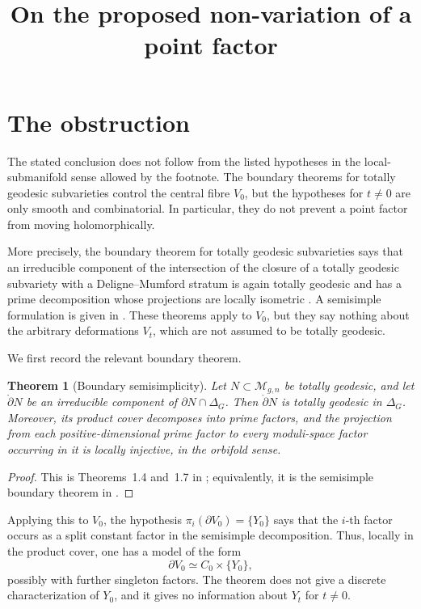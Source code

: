 \documentclass[11pt]{article}
\title{On the proposed non-variation of a point factor}
\author{}
\date{}
\newcommand{\M}{\mathcal M}
\newtheorem{theorem}{Theorem}[section]
\begin{document}
\maketitle

\section{The obstruction}

The stated conclusion does not follow from the listed hypotheses in the
local-submanifold sense allowed by the footnote.  The boundary theorems for
totally geodesic subvarieties control the central fibre \(V_0\), but the
hypotheses for \(t\neq 0\) are only smooth and combinatorial.  In particular,
they do not prevent a point factor from moving holomorphically.

More precisely, the boundary theorem for totally geodesic subvarieties says
that an irreducible component of the intersection of the closure of a totally
geodesic subvariety with a Deligne--Mumford stratum is again totally geodesic
and has a prime decomposition whose projections are locally isometric
\cite[Theorems~1.4 and~1.7]{BW}.  A semisimple formulation is given in
\cite[Theorem~1.3]{AW}.  These theorems apply to \(V_0\), but they say nothing
about the arbitrary deformations \(V_t\), which are not assumed to be totally
geodesic.

We first record the relevant boundary theorem.

\begin{theorem}[Boundary semisimplicity]
Let \(N\subset \M_{g,n}\) be totally geodesic, and let
\(\mathring{\partial}N\) be an irreducible component of
\(\partial N\cap \Delta_G\).  Then \(\mathring{\partial}N\) is totally
geodesic in \(\Delta_G\).  Moreover, its product cover decomposes into prime
factors, and the projection from each positive-dimensional prime factor to
every moduli-space factor occurring in it is locally injective, in the orbifold
sense.
\end{theorem}

\begin{proof}
This is Theorems~1.4 and~1.7 in \cite{BW}; equivalently, it is the semisimple
boundary theorem in \cite{AW}.
\end{proof}

Applying this to \(V_0\), the hypothesis
\(\pi_i(\partial V_0)=\{Y_0\}\) says that the \(i\)-th factor occurs as a
split constant factor in the semisimple decomposition.  Thus, locally in the
product cover, one has a model of the form
\[
\partial V_0 \simeq C_0\times \{Y_0\},
\]
possibly with further singleton factors.  The theorem does not give a discrete
characterization of \(Y_0\), and it gives no information about \(Y_t\) for
\(t\neq 0\).
\end{document}
